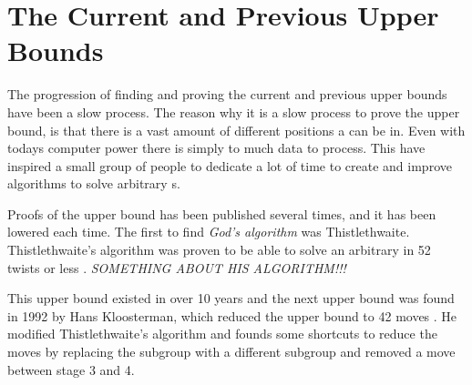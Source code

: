 \section{The Current and Previous Upper Bounds}
The progression of finding and proving the current and previous upper bounds have been a slow process.
The reason why it is a slow process to prove the upper bound, is that there is a vast amount of different positions a \rubik{} can be in. Even with todays computer power there is simply to much data to process. This have inspired a small group of people to dedicate a lot of time to create and improve algorithms to solve arbitrary \rubik{}s.

\begin{comment}

The set solver created by Thomas Rockicki, which was described in the previous section will now be further described.


The set solver has a special way of testing the \rubik{}s. It does not solve them to the unit position $e$, instead it finds a move sequence for a subgroup of the \rubik{} this way it can solve approximately 19.5 billion cubes at a time and not just one. The reason for this is that if you relabel an arbitrary cube, that given cube can be unlabeled to approximately 19.5 billion different cube positions. Recall that there are approximately 19.5 billion positions in the set \m{H} and all these positions are equal to $e$ when relabeled. The same logic applies to any other given position.
\end{comment}

Proofs of the upper bound has been published several times, and it has been lowered each time.
The first to find \textit{God's algorithm} was Thistlethwaite. Thistlethwaite's algorithm was proven to be able to solve an arbitrary \rubik{} in 52 twists or less \cite{jaapthistle}.
\emph{SOMETHING ABOUT HIS ALGORITHM!!!}

This upper bound existed in over 10 years and the next upper bound was found in 1992 by Hans Kloosterman, which reduced the upper bound to 42 moves \cite{rokickipdf}. 
He modified Thistlethwaite's algorithm and founds some shortcuts to reduce the moves by replacing the  subgroup with a different subgroup and removed a move between stage 3 and 4.

